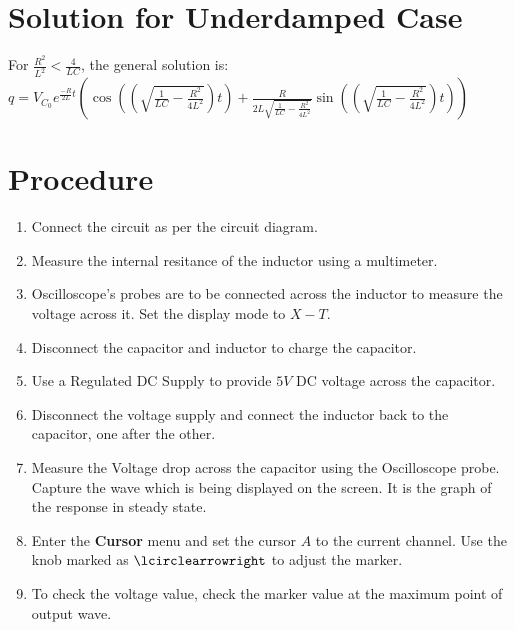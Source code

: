 \documentclass[12pt]{article}
\providecommand{\brak}[1]{\ensuremath{\left(#1\right)}}
\begin{document}
\section{Solution for Underdamped Case}
For $\frac{R^2}{L^2} < \frac{4}{LC}$, the general solution is:\newline
$q = V_{C_0} e^{\frac{-R}{2L}t} \brak{ \cos \brak{\brak{ \sqrt{\frac{1}{LC} - \frac{R^2}{4L^2}}} t } + \frac{R}{2L\sqrt{\frac{1}{LC} - \frac{R^2}{4L^2}}} \sin \brak{\brak{\sqrt{\frac{1}{LC} - \frac{R^2}{4L^2}}}t } }$

\section{Procedure}
\begin{enumerate}
    \item Connect the circuit as per the circuit diagram.
    \item Measure the internal resitance of the inductor using a multimeter.
    \item Oscilloscope's probes are to be connected across the inductor to measure the voltage across it. Set the display mode to $X - T$.
    \item Disconnect the capacitor and inductor to charge the capacitor.
    \item Use a Regulated DC Supply to provide $5 V$ DC voltage across the capacitor.
    \item Disconnect the voltage supply and connect the inductor back to the capacitor, one after the other. 
    \item Measure the Voltage drop across the capacitor using the Oscilloscope probe. Capture the wave which is being displayed on the screen. It is the graph of the response in steady state.
    \item Enter the \textbf{Cursor} menu and set the cursor $A$ to the current channel. Use the knob marked as $\lcirclearrowright$ to adjust the marker.
    \item To check the voltage value, check the marker value at the maximum point of output wave.
\end{enumerate}
\end{document}
